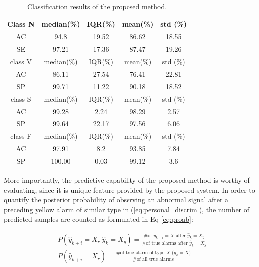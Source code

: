 \begin{table}[t]
	\caption{Classification results of the proposed method.}
	\centering
	\begin{tabular}{|c|c|c|c|c|}
		\hline
		Class N & median(\%) & IQR(\%) & mean(\%)& std (\%) \\ 
		\hline 
		AC & 94.8& 19.52 & 86.62 & 18.55\\ 
		\hline 
		SE & 97.21  & 17.36 & 87.47 &19.26 \\ 
		\hline 
		class V & median(\%) & IQR(\%) & mean(\%)& std (\%) \\ 
		\hline 
		AC & 86.11 & 27.54 & 76.41 & 22.81 \\ 
		\hline 
		SP & 99.71 & 11.22 & 90.18 & 18.52 \\ 
		\hline 
		class S & median(\%) & IQR(\%) & mean(\%)& std (\%)\\ 
		\hline 
		AC & 99.28 & 2.24& 98.29&2.57 \\ 
		\hline 
		SP & 99.64& 22.17& 97.56 & 6.06\\ 
		\hline 
		class F & median(\%) & IQR(\%) & mean(\%)& std (\%) \\ 
		\hline 
		AC & 97.91 & 8.2&93.85&7.84\\ 
		\hline 
		SP & 100.00 & 0.03&99.12&3.6\\ 
		\hline 
	\end{tabular} 
	\label{table:result1}
\end{table}


More importantly, the predictive capability of the proposed method is worthy of evaluating, since it is unique feature provided by the proposed system. In order to quantify the posterior probability of observing an abnormal signal after a preceding yellow alarm of similar type in (\ref{eq:personal_discrim}), the number of predicted samples are counted as formulated in Eq \ref{eq:proab}:

\begin{align}
\nonumber 
&P(\hat{y}_{k+i}=X_r|\hat{y}_{k}=X_y)=\frac{\text{\# of $y_{k+i}=X$ after $\hat{y}_k=X_y$}}{\text{\# of true alarms after $\hat{y}_k=X_y$}} \\
&P(\hat{y}_{k+i}=X_r)=\frac{\text{\# of true alarm of type $X$ ($y_{k}=X$)}}{\text{\# of all true alarms}} 
\label{eq:proab}
\end{align}

